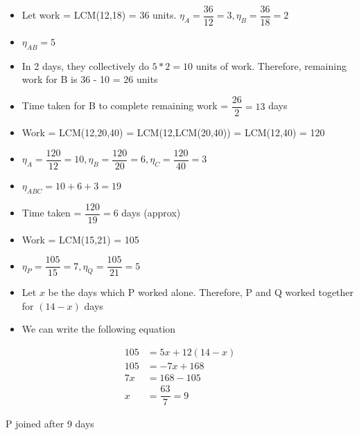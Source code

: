 
\begin{itemize}
    \item Let work = LCM(12,18) = 36 units. $\eta_A = \dfrac{36}{12} = 3, \eta_B = \dfrac{36}{18} = 2$
    \item $\eta_{AB} = 5$
    \item In 2 days, they collectively do $5 * 2 = 10$ units of work. Therefore, remaining work for B is 36 - 10 = 26 units
    \item Time taken for B to complete remaining work = $\dfrac{26}{2} = 13$ days
\end{itemize}


\begin{itemize}
    \item Work = LCM(12,20,40) = LCM(12,LCM(20,40)) = LCM(12,40) = 120
    \item $\eta_A = \dfrac{120}{12} = 10, \eta_B = \dfrac{120}{20} = 6, \eta_C = \dfrac{120}{40} = 3$
    \item $\eta_{ABC} = 10 + 6 + 3 = 19$
    \item Time taken = $\dfrac{120}{19} = 6$ days (approx)
\end{itemize}


\begin{itemize}
    \item Work = LCM(15,21) = 105
    \item $\eta_P = \dfrac{105}{15} = 7, \eta_Q = \dfrac{105}{21} = 5$
    \item Let $x$ be the days which P worked alone. Therefore, P and Q worked together for $(14 - x)$ days
    \item We can write the following equation
\end{itemize}

\begin{align*}
    105 &= 5x + 12 (14 - x) \\
    105 &= -7x + 168 \\
    7x &= 168 - 105 \\
    x &= \dfrac{63}{7} = 9
\end{align*}

P joined after 9 days
